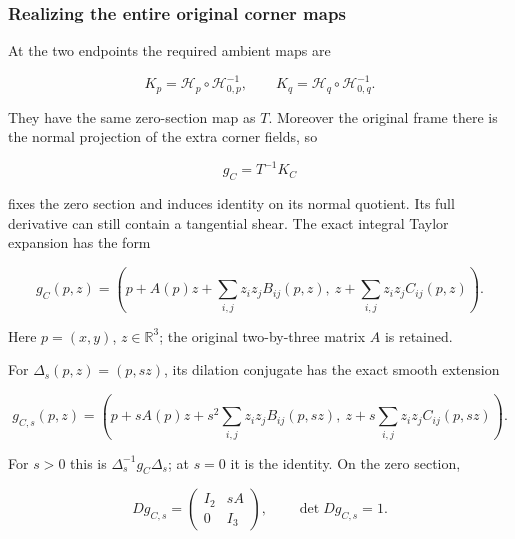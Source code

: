 \subsubsection{Realizing the entire original corner maps}
\label{courseIII:whitney-move-with-controlled-support:section-5.2}

At the two endpoints the required ambient maps are

\begin{equation}
K_p=\mathcal H_p\circ\mathcal H_{0,p}^{-1},\qquad
K_q=\mathcal H_q\circ\mathcal H_{0,q}^{-1}.
\label{courseIII:whitney-move-with-controlled-support:eq:5.3}
\end{equation}

They have the same zero-section map as \(T\). Moreover the original frame there is the normal projection of the extra corner fields, so

\begin{equation}
g_C=T^{-1}K_C
\label{courseIII:whitney-move-with-controlled-support:eq:5.4}
\end{equation}

fixes the zero section and induces identity on its normal quotient. Its full derivative can still contain a tangential shear. The exact integral Taylor expansion has the form

\begin{equation}
g_C(p,z)=
\left(p+A(p)z+\sum_{i,j}z_i z_jB_{ij}(p,z),\
z+\sum_{i,j}z_i z_jC_{ij}(p,z)\right).
\label{courseIII:whitney-move-with-controlled-support:eq:5.5}
\end{equation}

Here \(p=(x,y)\), \(z\in\mathbb R^3\); the original two-by-three matrix \(A\) is retained.

For \(\Delta_s(p,z)=(p,sz)\), its dilation conjugate has the exact smooth extension

\begin{equation}
g_{C,s}(p,z)=
\left(p+sA(p)z+s^2\sum_{i,j}z_i z_jB_{ij}(p,sz),\
z+s\sum_{i,j}z_i z_jC_{ij}(p,sz)\right).
\label{courseIII:whitney-move-with-controlled-support:eq:5.6}
\end{equation}

For \(s>0\) this is \(\Delta_s^{-1}g_C\Delta_s\); at \(s=0\) it is the identity. On the zero section,

\begin{equation}
Dg_{C,s}=
\begin{pmatrix}I_2&sA\\0&I_3\end{pmatrix},\qquad
\det Dg_{C,s}=1.
\label{courseIII:whitney-move-with-controlled-support:eq:5.7}
\end{equation}

